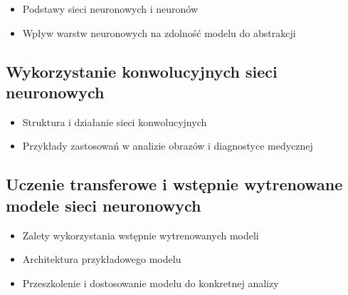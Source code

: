 \begin{itemize}
  \item Podstawy sieci neuronowych i neuronów
  \item Wpływ warstw neuronowych na zdolność modelu do abstrakcji
\end{itemize}

\subsection{Wykorzystanie konwolucyjnych sieci neuronowych}

\begin{itemize}
  \item Struktura i działanie sieci konwolucyjnych
  \item Przykłady zastosowań w analizie obrazów i diagnostyce medycznej
\end{itemize}

\subsection{Uczenie transferowe i wstępnie wytrenowane modele sieci neuronowych}

\begin{itemize}
  \item Zalety wykorzystania wstępnie wytrenowanych modeli
  \item Architektura przykładowego modelu
  \item Przeszkolenie i dostosowanie modelu do konkretnej analizy
\end{itemize}
